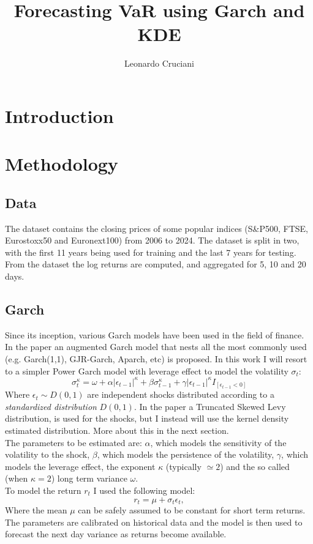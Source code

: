 \documentclass[12pt]{article}
\author{Leonardo Cruciani}
\title{Forecasting VaR using Garch and KDE}
\begin{document}
    \section{Introduction}
    \section{Methodology}
    \subsection{Data}
        The dataset contains the closing prices of some popular indices (S\&P500, FTSE, Eurostoxx50 and Euronext100) from 2006 to 2024.
        The dataset is split in two, with the first 11 years being used for training and the last 7 years for testing.
        From the dataset the log returns are computed, and aggregated for 5, 10 and 20 days.

    \subsection{Garch}
        Since its inception, various Garch models have been used in the field of finance.
        In the paper \cite{thorsten} an augmented Garch model that nests all the most commonly used (e.g. Garch(1,1), GJR-Garch, Aparch, etc) is proposed.
        In this work I will resort to a simpler Power Garch model with leverage effect to model the volatility $\sigma_t$:
        \begin{equation}
            \sigma_t^\kappa = \omega
            + \alpha \left|\epsilon_{t-1}\right|^\kappa
            + \beta \sigma_{t-1}^\kappa
            + \gamma \left|\epsilon_{t-1}\right|^\kappa I_{[\epsilon_{t-1}<0]}
        \end{equation}
        Where $\epsilon_t \sim D(0,1)$ are independent shocks distributed according to a \textit{standardized distribution} $D(0,1)$. In the paper \cite{thorsten} a
        Truncated Skewed Levy distribution, is used for the shocks, but I instead will use the kernel density estimated distribution. More about this in the next section.\\
        The parameters to be estimated are: $\alpha$, which models the sensitivity of the volatility to the shock, $\beta$, which models the persistence of the volatility, $\gamma$, which models the leverage effect, the exponent $\kappa$ (typically $\simeq 2$) and the so called (when $\kappa=2$) long term variance $\omega$.\\
        To model the return $r_t$ I used the following model:
        \begin{equation}
                r_t = \mu + \sigma_t \epsilon_t,
        \end{equation}
        Where the mean $\mu$ can be safely assumed to be constant for short term returns.
        The parameters are calibrated on historical data and the model is then used to forecast the next day variance as returns become available.
\end{document}
